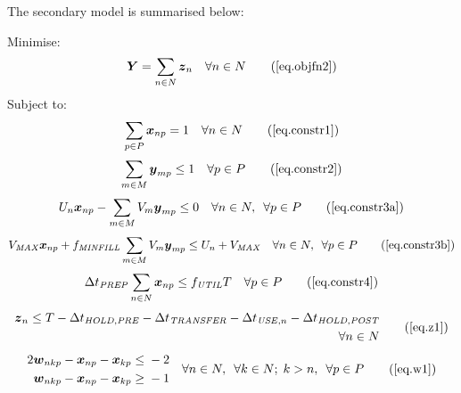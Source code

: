 The secondary model is summarised below:

Minimise:
\begin{equation}
    \boldsymbol{Y} = \sum_{n \in N} \boldsymbol{z}_{n} \quad \forall n \in N
    \tag{\ref{eq.objfn2}}
\end{equation}
Subject to:
\begin{equation}
    \sum_{p \in P} \boldsymbol{x}_{np} = 1 \quad \forall n \in N
    \tag{\ref{eq.constr1}}
\end{equation}
\begin{equation}
    \sum_{m \in M} \boldsymbol{y}_{mp} \le 1 \quad \forall p \in P
    \tag{\ref{eq.constr2}}
\end{equation}
\begin{equation}
    U_{n} \boldsymbol{x}_{np} - \sum_{m \in M} V_{m} \boldsymbol{y}_{mp} \le 0
    \quad \forall n \in N, \enspace \forall p \in P
    \tag{\ref{eq.constr3a}}
\end{equation}
\begin{equation}
    V_{\mathit{MAX}} \boldsymbol{x}_{np} + f_{\mathit{MINFILL}} \sum_{m \in M}
    V_{m} \boldsymbol{y}_{mp} \le U_{n} + V_{\mathit{MAX}} \quad \forall n \in
    N, \enspace \forall p \in P
    \tag{\ref{eq.constr3b}}
\end{equation}
\begin{equation}
    \Delta t_{\mathit{PREP}} \sum_{n \in N} \boldsymbol{x}_{np} \le
    f_{\mathit{UTIL}} T \quad \forall p \in P
    \tag{\ref{eq.constr4}}
\end{equation}
\begin{equation}
    \begin{aligned}
        \boldsymbol{z}_{n} \le T - \Delta t_{\mathit{HOLD,PRE}}
        - \Delta t_{\mathit{TRANSFER}} - \Delta t_{\mathit{USE},n}
        - \Delta t_{\mathit{HOLD,POST}}\\
        \quad \forall n \in N
    \end{aligned}
    \tag{\ref{eq.z1}}
\end{equation}
\begin{equation}
    \begin{split}
        \begin{alignedat}{11}
            2&\boldsymbol{w}_{nkp} {}-{} &&\boldsymbol{x}_{np}
            {}-{} && \boldsymbol{x}_{kp} {}&&\le{} &{}-{} 2\\
            &\boldsymbol{w}_{nkp} {}-{} &&\boldsymbol{x}_{np}
            {}-{} && \boldsymbol{x}_{kp} {}&&\ge{} &{}-{} 1\\
        \end{alignedat}
    \end{split}
    \quad
    \begin{split}
        \forall n \in N, \enspace \forall k \in N; \; k > n, \enspace 
        \forall p \in P
    \end{split}
    \tag{\ref{eq.w1}}
\end{equation}
